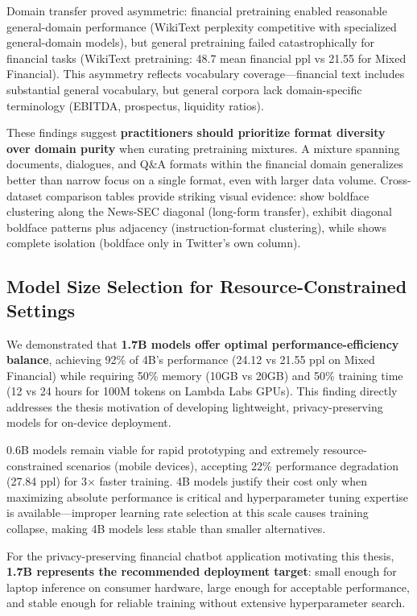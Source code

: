 Domain transfer proved asymmetric: financial pretraining enabled reasonable general-domain performance (WikiText perplexity competitive with specialized general-domain models), but general pretraining failed catastrophically for financial tasks (WikiText pretraining: 48.7 mean financial ppl vs 21.55 for Mixed Financial). This asymmetry reflects vocabulary coverage—financial text includes substantial general vocabulary, but general corpora lack domain-specific terminology (EBITDA, prospectus, liquidity ratios).

These findings suggest \textbf{practitioners should prioritize format diversity over domain purity} when curating pretraining mixtures. A mixture spanning documents, dialogues, and Q\&A formats within the financial domain generalizes better than narrow focus on a single format, even with larger data volume. Cross-dataset comparison tables provide striking visual evidence:  show boldface clustering along the News-SEC diagonal (long-form transfer),  exhibit diagonal boldface patterns plus adjacency (instruction-format clustering), while  shows complete isolation (boldface only in Twitter's own column).

\subsection{Model Size Selection for Resource-Constrained Settings}

We demonstrated that \textbf{1.7B models offer optimal performance-efficiency balance}, achieving 92\% of 4B's performance (24.12 vs 21.55 ppl on Mixed Financial) while requiring 50\% memory (10GB vs 20GB) and 50\% training time (12 vs 24 hours for 100M tokens on Lambda Labs GPUs). This finding directly addresses the thesis motivation of developing lightweight, privacy-preserving models for on-device deployment.

0.6B models remain viable for rapid prototyping and extremely resource-constrained scenarios (mobile devices), accepting 22\% performance degradation (27.84 ppl) for 3$\times$ faster training. 4B models justify their cost only when maximizing absolute performance is critical and hyperparameter tuning expertise is available—improper learning rate selection at this scale causes training collapse, making 4B models less stable than smaller alternatives.

For the privacy-preserving financial chatbot application motivating this thesis, \textbf{1.7B represents the recommended deployment target}: small enough for laptop inference on consumer hardware, large enough for acceptable performance, and stable enough for reliable training without extensive hyperparameter search.

